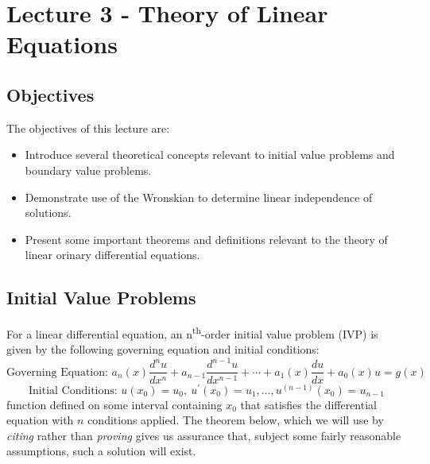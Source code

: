 \chapter{Lecture 3 - Theory of Linear Equations}
\label{ch:lec3}
\section{Objectives}
The objectives of this lecture are:
\begin{itemize}
\item Introduce several theoretical concepts relevant to initial value problems and boundary value problems.
\item Demonstrate use of the Wronskian to determine linear independence of solutions.
\item Present some important theorems and definitions relevant to the theory of linear orinary differential equations.
\end{itemize}

\section{Initial Value Problems}

For a linear differential equation, an n\textsuperscript{th}-order initial value problem (IVP) is given by the following governing equation and initial conditions:
\begin{equation}
\text{Governing Equation: }a_n(x)\frac{d^n u}{dx^n}+a_{n-1}\frac{d^{n-1}u}{dx^{n-1}}+\cdots+a_1(x)\frac{du}{dx}+a_0(x)u=g(x)
\label{eq:ivp-ge}
\end{equation}
\begin{equation}
\text{Initial Conditions: }u(x_0)=u_0, \ u^{\prime}(x_0)=u_1,\dots,u^{(n-1)}(x_0)=u_{n-1}
\label{eq:ivp-ics}
\end{equation}
\noindent {} function defined on some interval containing $x_0$ that satisfies the differential equation with $n$ conditions applied. The theorem below, which we will use by \emph{citing} rather than \emph{proving} gives us assurance that, subject some fairly reasonable assumptions, such a solution will exist.  

